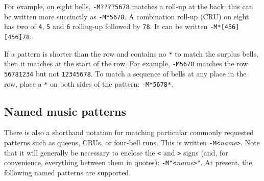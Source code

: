 \documentclass[a4paper,11pt,oneside]{book}
\begin{document}
For example, on eight bells, \verb+-M????5678+ matches a roll-up 
at the back; this can be written more succinctly as \verb+-M*5678+.  A 
combination roll-up (CRU)%
 on eight
has two of \verb+4+, \verb+5+ and \verb+6+ rolling-up followed by \verb+78+.
It can be written \verb+-M*[456][456]78+.

If a pattern is shorter than the row and contains no \verb+*+ to match the
surplus bells, then it matches at the start of the row.  For example,
\verb+-M5678+ matches the row \verb+56781234+ but not \verb+12345678+.  To
match a sequence of bells at any place in the row, place a \verb+*+ on
both sides of the pattern: \verb+-M*5678*+.

\subsection{Named music patterns}\label{musnamed}

There is also a shorthand notation for matching particular commonly requested
patterns such as queens, CRUs, or four-bell runs.  This is written
\verb+-M<+\textit{name}\verb+>+.  Note that it will generally be necessary to 
enclose the \verb+<+ and \verb+>+ signs (and, for convenience, everything 
between them in quotes): \verb+-M"<+\textit{name}\verb+>"+.%
At present, the following named patterns are supported.
\end{document}
